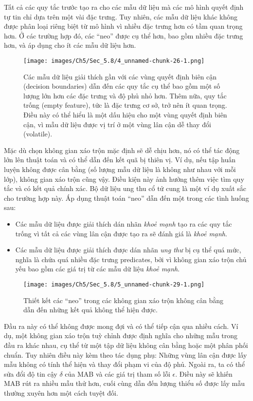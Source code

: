 Tất cả các quy tắc trước tạo ra cho các mẫu dữ liệu mà các mô hình quyết định tự tin chỉ dựa trên một vài đặc trưng. Tuy nhiên, các mẫu dữ liệu khác không được phân loại riêng biệt từ mô hình vì nhiều đặc trưng hơn có tầm quan trọng hơn. Ở các trường hợp đó, các “neo” được cụ thể hơn, bao gồm nhiều đặc trưng hơn, và áp dụng cho ít các mẫu dữ liệu hơn. 

\begin{figure*}[h!]
	\centering
	\texttt{[image: images/Ch5/Sec\_5.8/4\_unnamed-chunk-26-1.png]}
	\label{fig:5_40}
	\caption{ Các mẫu dữ liệu giải thích gần với các vùng quyết định biên cận (decision boundaries) dẫn đến các quy tắc cụ thể bao gồm một số lượng lớn hơn các đặc trưng và độ phủ nhỏ hơn. Thêm nữa, quy tắc trống (empty feature), tức là đặc trưng cơ sở, trở nên ít quan trọng. Điều này có thể hiểu là một dấu hiệu cho một vùng quyết định biên cận, vì mẫu dữ liệu được vị trí ở một vùng lân cận dễ thay đổi (volatile).}
\end{figure*}
Mặc dù chọn không gian xáo trộn mặc định sẽ dễ chịu hơn, nó có thể tác động lớn lên thuật toán và có thể dẫn đến kết quã bị thiên vị. Ví dụ, nếu tập huấn luyện không được cân bằng (số lượng mẫu dữ liệu là không như nhau với mỗi lớp), không gian xáo trộn cũng vậy. Điều kiện này ảnh hưởng thêm việc tìm quy tắc và có kết quả chính xác.
Bộ dữ liệu ung thu cổ tử cung là một ví dụ xuất sắc cho trường hợp này. Áp dụng thuật toán “neo” dẫn đến một trong các tình huống sau: 
\begin{itemize}
\item Các mẫu dữ liệu được giải thích dán nhãn \textit{khoẻ mạnh} tạo ra các quy tắc trống vì tất cả các vùng lân cận được tạo ra sẽ đánh giá là \textit{khoẻ mạnh}.
\item Các mẫu dữ liệu được giải thích được dán nhãn \textit{ung thư} bị cụ thể quá mức, nghĩa là chứa quá nhiều đặc trưng predicates, bởi vì không gian xáo trộn chủ yếu bao gồm các giá trị từ các mẫu dữ liệu \textit{khoẻ mạnh}.
\end{itemize}
\begin{figure*}[h!]
	\centering
	\texttt{[image: images/Ch5/Sec\_5.8/5\_unnamed-chunk-29-1.png]}
	\label{fig:5_41}
	\caption{Thiết kết các “neo” trong các không gian xáo trộn không cân bằng dẫn đến những kết quả không thể hiện được. }
\end{figure*}

Đầu ra này có thể không được mong đợi và có thể tiếp cận qua nhiều cách. Ví dụ, một không gian xáo trộn tuỳ chỉnh được định nghĩa cho những mẫu trong đầu ra khác nhau, cụ thể từ một tập dữ liệu không cân bằng hoặc một phân phối chuẩn. Tuy nhiên điều này kèm theo tác dụng phụ: Những vùng lân cận được lấy mẫu không có tính thể hiện và thay đổi phạm vi của độ phủ. Ngoài ra, ta có thể sửa đổi độ tin cậy $\delta$ của MAB và các giá trị tham số lỗi $\epsilon $. Điều này sẽ khiến MAB rút ra nhiều mẫu thử hơn, cuối cùng dẫn đến lượng thiểu số được lấy mẫu thường xuyên hơn một cách tuyệt đối.

